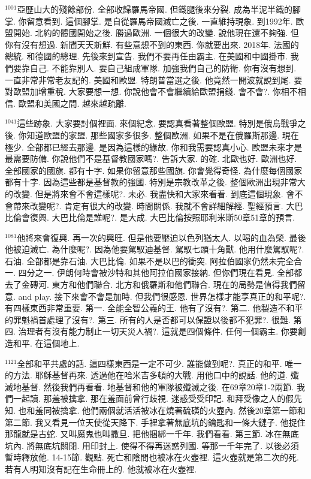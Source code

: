 \documentclass{book}
\begin{document}
$^{1001}$亞歷山大的殘餘部份.
全部收歸羅馬帝國.
但鐵腿後來分裂.
成為半泥半鐵的腳掌.
你留意看到.
這個腳掌.
是自從羅馬帝國滅亡之後.
一直維持現象.
到1992年.
歐盟開始.
北約的體國開始之後.
勝過歐洲.
一個很大的改變.
說他現在還不夠強.
但你有沒有想過.
新聞天天新鮮.
有些意想不到的東西.
你就要出來.
2018年.
法國的總統.
和德國的總理.
先後來到宣告.
我們不要再任由霸主.
在美國和中國掛市.
我們要靠自己.
不能靠別人.
要自己組成軍隊.
加強我們自己的防衛.
你有沒有想到.
一直非常非常老友記的.
美國和歐盟.
特朗普當選之後.
他竟然一開波就說到尾.
要對歐盟加增重稅.
大家要想一想.
你說他會不會繼續給歐盟捐錢.
會不會?.
你相不相信.
歐盟和美國之間.
越來越疏離.

$^{1041}$這些跡象.
大家要討個裡面.
來個紀念.
要認真看著整個歐盟.
特別是俄烏戰爭之後.
你知道歐盟的家盟.
那些國家多很多.
整個歐洲.
如果不是在俄羅斯那邊.
現在極少.
全部都已經去那邊.
是因為這樣的緣故.
你和我需要認真小心.
歐盟未來才是最需要防備.
你說他們不是基督教國家嗎?.
告訴大家.
的確.
北歐也好.
歐洲也好.
全部國家的國旗.
都有十字.
如果你留意那些國旗.
你會覺得奇怪.
為什麼每個國家都有十字.
因為這些都是基督教的強國.
特別是宗教改革之後.
整個歐洲出現非常大的改變.
但是將來會不會這樣呢?.
未必.
我盡快和大家來看看.
到底這個現象.
會不會帶來改變呢?.
肯定有很大的改變.
時間關係.
我就不會詳細解經.
聖經預言.
大巴比倫會復興.
大巴比倫是誰呢?.
是大成.
大巴比倫按照耶利米斯50章51章的預言.

$^{1081}$他將來會復興.
再一次的興旺.
但是他要壓迫以色列猶太人.
以喝的血為榮.
最後他被迫滅亡.
為什麼呢?.
因為他要駕馭迪基督.
駕馭七頭十角獸.
他用什麼駕馭呢?.
石油.
全部都是靠石油.
大巴比倫.
如果不是以巴的衝突.
阿拉伯國家仍然未完全合一.
四分之一.
伊朗何時會被沙特和其他阿拉伯國家接納.
但你們現在看見.
全部都去了金磚河.
東方和他們聯合.
北方和俄羅斯和他們聯合.
現在的局勢是值得我們留意.
and play.
接下來會不會是加時.
但我們很感恩.
世界怎樣才能享真正的和平呢?.
有四樣東西非常重要.
第一.
全能全智公義的王.
他有了沒有?.
第二.
他製造不和平的罪魁禍首處理了沒有?.
第三.
所有的人是否都可以保證以後都不犯罪?.
很難.
第四.
治理者有沒有能力制止一切天災人禍?.
這就是四個條件.
任何一個霸主.
你要創造和平.
在這個地上.

$^{1121}$全部和平共處的話.
這四樣東西是一定不可少.
誰能做到呢?.
真正的和平.
唯一的方法.
耶穌基督再來.
透過他在哈米吉多頓的大戰.
用他口中的說話.
他的道.
殲滅地基督.
然後我們再看看.
地基督和他的軍隊被殲滅之後.
在69章20章1-2兩節.
我們一起讀.
那羞被擒拿.
那在羞面前曾行歧視.
迷惑受受印記.
和拜受像之人的假先知.
也和羞同被擒拿.
他們兩個就活活被冰在燒著硫磺的火壺內.
然後20章第一節和第二節.
我又看見一位天使從天降下.
手裡拿著無底坑的鑰匙和一條大鏈子.
他捉住那龍就是古蛇.
又叫魔鬼也叫撒旦.
把他捆綁一千年.
我們看看.
第三節.
冰在無底坑內.
將無底坑關閉.
用印封上.
使得不得再迷惑列國.
等那一千年完了.
以後必須暫時釋放他.
14-15節.
觀點.
死亡和陰間也被冰在火壺裡.
這火壺就是第二次的死.
若有人明知沒有記在生命冊上的.
他就被冰在火壺裡.
\end{document}

